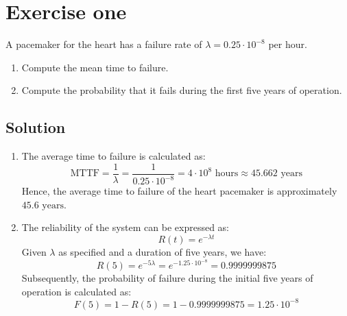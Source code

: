 \section{Exercise one}

A pacemaker for the heart has a failure rate of $\lambda = 0.25 \cdot 10^{-8}$ per hour.
\begin{enumerate}
    \item Compute the mean time to failure. 
    \item Compute the probability that it fails during the first five years of operation.
\end{enumerate}

\subsection*{Solution}
\begin{enumerate}
    \item The average time to failure is calculated as:
        \[\text{MTTF}=\dfrac{1}{\lambda}=\dfrac{1}{0.25 \cdot 10^{-8}}=4\cdot 10^8\text{ hours}\approx 45.662\text{ years}\]
        Hence, the average time to failure of the heart pacemaker is approximately $45.6\text{ years}$. 
    \item The reliability of the system can be expressed as:
        \[R(t)=e^{-\lambda t}\]
        Given $\lambda$ as specified and a duration of five years, we have:
        \[R(5)=e^{-5\lambda}=e^{-1.25\cdot 10^{-8}}=0.9999999875\]
        Subsequently, the probability of failure during the initial five years of operation is calculated as:
        \[F(5)=1-R(5)=1-0.9999999875=1.25 \cdot 10^{-8}\]
\end{enumerate}